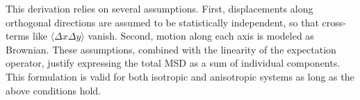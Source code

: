 \documentclass[%
preprint,
amsmath,amssymb,
aps,
]{revtex4-2}
\newcommand{\?}{\stackrel{?}{=}}
\begin{document}
This derivation relies on several assumptions. First, displacements along orthogonal directions are assumed to be statistically independent, so that cross-terms like $\langle \Delta x \Delta y \rangle$ vanish. Second, motion along each axis is modeled as Brownian. These assumptions, combined with the linearity of the expectation operator, justify expressing the total MSD as a sum of individual components. This formulation is valid for both isotropic and anisotropic systems as long as the above conditions hold.


\end{document}
